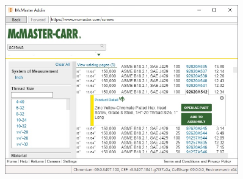 \documentclass[12pt, letterpaper]{article}
\begin{document}
\begin{figure}[H]
    \centering    
    \begin{minipage}{0.6\textwidth}
        \includegraphics[width=0.9\textwidth]{Figures/webBrowserNewButtons.jpg}
    \end{minipage}
    \begin{minipage}{0.2\textwidth}

\end{minipage}
\end{figure}
\end{document}
